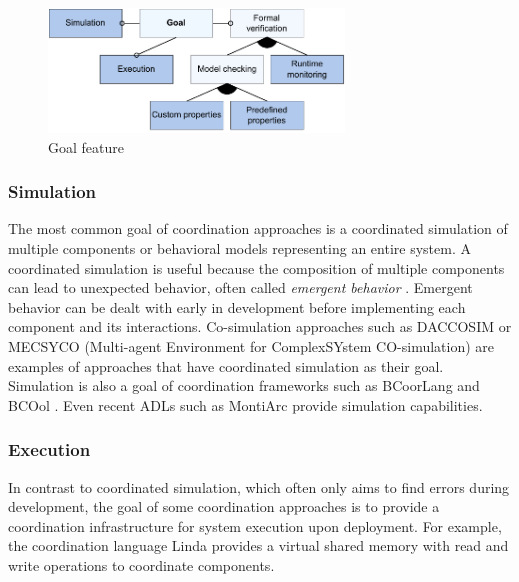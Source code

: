 \documentclass[runningheads]{llncs}
\begin{document}
\begin{figure}[ht]
	\centering
	\includegraphics[width=0.7\textwidth]{images/goal_feature}
	\caption{Goal feature}
	\label{fig:goalFeature}
\end{figure}

\subsubsection{Simulation} The most common goal of coordination approaches is a coordinated simulation of multiple components or behavioral models representing an entire system.
A coordinated simulation is useful because the composition of multiple components can lead to unexpected behavior, often called \textit{emergent behavior} \cite{ekerTamingHeterogeneityPtolemy2003}.
Emergent behavior can be dealt with early in development before implementing each component and its interactions.
Co-simulation approaches such as DACCOSIM \cite{galtierFMIBasedDistributedMultisimulation2015,dadSynthesisFeedbackDistribution2021} or MECSYCO (Multi-agent Environment for ComplexSYstem CO-simulation) \cite{camusHybridCosimulationFMUs2016,camusCosimulationCyberphysicalSystems2018} are examples of approaches that have coordinated simulation as their goal.
Simulation is also a goal of coordination frameworks such as BCoorLang \cite{krauterBehavioralConsistencyMultimodeling2023} and BCOol \cite{varalarsenBehavioralCoordinationOperator2015}.
Even recent ADLs such as MontiArc \cite{haberMontiArcArchitecturalModeling2014} provide simulation capabilities.

\subsubsection{Execution} In contrast to coordinated simulation, which often only aims to find errors during development, the goal of some coordination approaches is to provide a coordination infrastructure for system execution upon deployment.
For example, the coordination language Linda provides a virtual shared memory with read and write operations to coordinate components.
\end{document}
